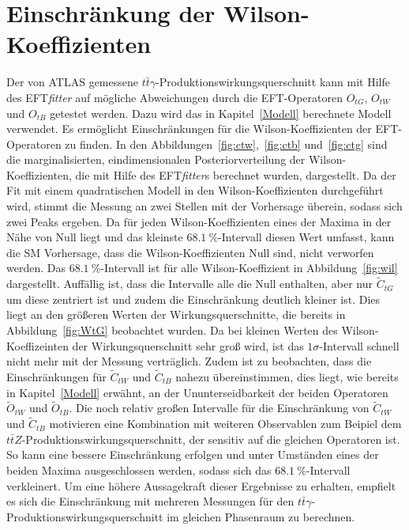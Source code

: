 \section{Einschränkung der Wilson-Koeffizienten}
 Der von ATLAS gemessene $t\bar{t}\gamma$-Produktionswirkungsquerschnitt kann mit Hilfe des EFT\textit{fitter} auf mögliche Abweichungen durch die EFT-Operatoren $O_{tG}$, $O_{tW}$ und $O_{tB}$ getestet werden. Dazu wird das in Kapitel~\ref{Modell} berechnete Modell verwendet. Es ermöglicht Einschränkungen für die Wilson-Koeffizienten der EFT-Operatoren zu finden.
In den Abbildungen~\ref{fig:ctw},~\ref{fig:ctb} und~\ref{fig:ctg} sind die marginalisierten, eindimensionalen Posteriorverteilung der Wilson-Koeffizienten, die mit Hilfe des EFT\textit{fitter}s berechnet wurden, dargestellt.
Da der Fit mit einem quadratischen Modell in den Wilson-Koeffizienten durchgeführt wird, stimmt die Messung an zwei Stellen mit der Vorhersage überein, sodass sich zwei Peaks ergeben.
Da für jeden Wilson-Koeffizienten eines der Maxima in der Nähe von Null liegt und das kleinste $\SI{68.1}{\percent}$-Intervall diesen Wert umfasst, kann die SM Vorhersage, dass die Wilson-Koeffizienten Null sind, nicht verworfen werden.
Das $\SI{68.1}{\percent}$-Intervall ist für alle Wilson-Koeffizient in Abbildung~\ref{fig:wil} dargestellt. Auffällig ist, dass die Intervalle alle die Null enthalten, aber nur $\tilde{C}_{tG}$ um diese zentriert ist und zudem die Einschränkung deutlich kleiner ist.
Dies liegt an den größeren Werten der Wirkungsquerschnitte, die bereits in Abbildung~\ref{fig:WtG} beobachtet wurden. Da bei kleinen Werten des Wilson-Koeffizeinten der Wirkungsquerschnitt sehr groß wird, ist das $1\sigma$-Intervall schnell nicht mehr mit der Messung verträglich.
Zudem ist zu beobachten, dass die Einschränkungen für $\tilde{C}_{tW}$ und $\tilde{C}_{tB}$ nahezu übereinstimmen, dies liegt, wie bereits in Kapitel~\ref{Modell} erwähnt, an der Ununterseidbarkeit der beiden Operatoren $\tilde{O}_{tW}$ und $\tilde{O}_{tB}$.
Die noch relativ großen Intervalle für die Einschränkung von $\tilde{C}_{tW}$ und $\tilde{C}_{tB}$ motivieren eine Kombination mit weiteren Observablen zum Beipiel dem $t\bar{t}Z$-Produktionswirkungsquerschnitt, der sensitiv auf die gleichen Operatoren ist. So kann eine bessere Einschränkung erfolgen und unter Umständen eines der beiden Maxima ausgeschlossen werden, sodass sich das $\SI{68.1}{\percent}$-Intervall verkleinert.
Um eine höhere Aussagekraft dieser Ergebnisse zu erhalten, empfielt es sich die Einschränkung mit mehreren Messungen für den $t\bar{t}\gamma$-Produktionswirkungsquerschnitt im gleichen Phasenraum zu berechnen.
